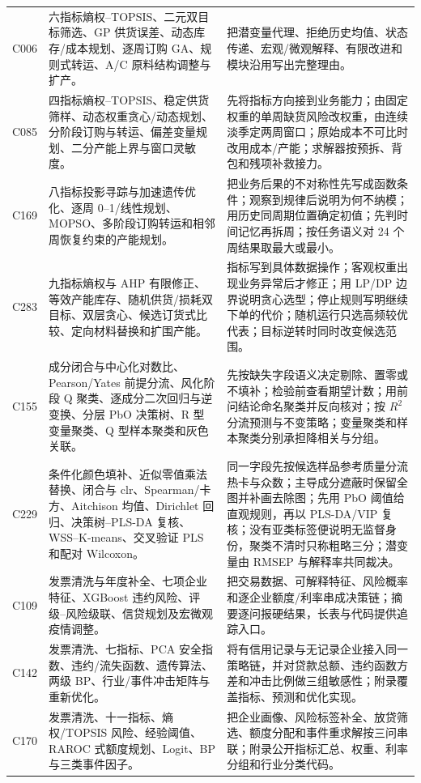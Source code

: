 \begin{longtable}{p{1.4cm}p{5.2cm}p{7.0cm}}
C006 & 六指标熵权--TOPSIS、二元双目标筛选、GP 供货误差、动态库存/成本规划、逐周订购 GA、规则式转运、A/C 原料结构调整与扩产。 &
把潜变量代理、拒绝历史均值、状态传递、宏观/微观解释、有限改进和模块沿用写出完整理由。\\
C085 & 四指标熵权--TOPSIS、稳定供货筛样、动态权重贪心/动态规划、分阶段订购与转运、偏差变量规划、二分产能上界与窗口灵敏度。 &
先将指标方向接到业务能力；由固定权重的单周缺货风险改权重，由连续淡季定两周窗口；原始成本不可比时改用成本/产能；求解器按预拆、背包和残项补救接力。\\
C169 & 八指标投影寻踪与加速遗传优化、逐周 0--1/线性规划、MOPSO、多阶段订购转运和相邻周恢复约束的产能规划。 &
把业务后果的不对称性先写成函数条件；观察到规律后说明为何不纳模；用历史同周期位置确定初值；先判时间记忆再拆周；按任务语义对 24 个周结果取最大或最小。\\
C283 & 九指标熵权与 AHP 有限修正、等效产能库存、随机供货/损耗双目标、双层贪心、候选订货式比较、定向材料替换和扩围产能。 &
指标写到具体数据操作；客观权重出现业务异常后才修正；用 LP/DP 边界说明贪心选型；停止规则写明继续下单的代价；随机运行只选高频较优代表；目标逆转时同时改变候选范围。\\
C155 & 成分闭合与中心化对数比、Pearson/Yates 前提分流、风化阶段 Q 聚类、逐成分二次回归与逆变换、分层 PbO 决策树、R 型变量聚类、Q 型样本聚类和灰色关联。 &
先按缺失字段语义决定剔除、置零或不填补；检验前查看期望计数；用前问结论命名聚类并反向核对；按 $R^2$ 分流预测与不变策略；变量聚类和样本聚类分别承担降相关与分组。\\
C229 & 条件化颜色填补、近似零值乘法替换、闭合与 clr、Spearman/卡方、Aitchison 均值、Dirichlet 回归、决策树--PLS-DA 复核、WSS--K-means、交叉验证 PLS 和配对 Wilcoxon。 &
同一字段先按候选样品参考质量分流热卡与众数；主导成分遮蔽时保留全图并补画去除图；先用 PbO 阈值给直观规则，再以 PLS-DA/VIP 复核；没有亚类标签便说明无监督身份，聚类不清时只称粗略三分；潜变量由 RMSEP 与解释率共同裁决。\\
C109 & 发票清洗与年度补全、七项企业特征、XGBoost 违约风险、评级--风险级联、信贷规划及宏微观疫情调整。 &
把交易数据、可解释特征、风险概率和逐企业额度/利率串成决策链；摘要逐问报硬结果，长表与代码提供追踪入口。\\
C142 & 发票清洗、七指标、PCA 安全指数、违约/流失函数、遗传算法、两级 BP、行业/事件冲击矩阵与重新优化。 &
将有信用记录与无记录企业接入同一策略链，并对贷款总额、违约函数方差和冲击比例做三组敏感性；附录覆盖指标、预测和优化实现。\\
C170 & 发票清洗、十一指标、熵权/TOPSIS 风险、经验阈值、RAROC 式额度规划、Logit、BP 与三类事件因子。 &
把企业画像、风险标签补全、放贷筛选、额度分配和事件重求解按三问串联；附录公开指标汇总、权重、利率分组和行业分类代码。\\

\end{longtable}
